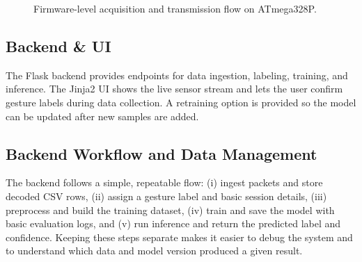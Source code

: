 \documentclass[conference]{IEEEtran}
\begin{document}
\begin{figure}[htbp]
{\begin{minipage}{0.94\linewidth}
    \end{minipage}%
    \vspace*{2mm}%
    }%
    \caption{Firmware-level acquisition and transmission flow on ATmega328P.}
    \label{fig:firmware}
\end{figure}

\subsection{Backend \& UI}
The Flask backend provides endpoints for data ingestion, labeling, training, and inference\cite{flask}. The Jinja2 UI shows the live sensor stream and lets the user confirm gesture labels during data collection. A retraining option is provided so the model can be updated after new samples are added.

\subsection{Backend Workflow and Data Management}
The backend follows a simple, repeatable flow: (i) ingest packets and store decoded CSV rows, (ii) assign a gesture label and basic session details, (iii) preprocess and build the training dataset, (iv) train and save the model with basic evaluation logs, and (v) run inference and return the predicted label and confidence. Keeping these steps separate makes it easier to debug the system and to understand which data and model version produced a given result.
\end{document}
